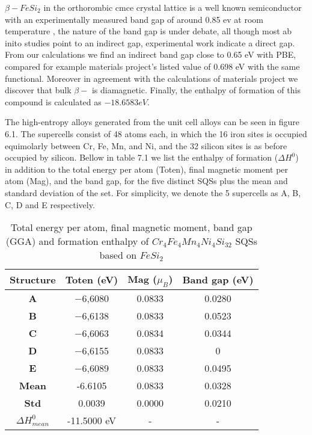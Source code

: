 $\beta-FeSi_2$ in the orthorombic cmce crystal lattice is a well known semiconductor with an experimentally measured band gap of around 0.85 ev at room temperature \cite{PhysRevB.58.10389}, the nature of the band gap is under debate, all though most ab inito studies point to an indirect gap, experimental work indicate a direct gap. From our calculations we find an indirect band gap close to 0.65 eV with PBE, compared for example materials project's listed value of 0.698 eV with the same functional. Moreover in agreement with the calculations of materials project we discover that bulk $\beta-$  is diamagnetic. Finally, the enthalpy of formation of this compound is calculated as $-18.6583 eV$.

The high-entropy alloys generated from the  unit cell alloys can be seen in figure 6.1. The supercells consist of 48 atoms each, in which the 16 iron sites is occupied equimolarly between Cr, Fe, Mn, and Ni, and the 32 silicon sites is as before occupied by silicon. Bellow in table 7.1 we list the enthalpy of formation ($\Delta H^0$) in addition to the total energy per atom (Toten), final magnetic moment per atom (Mag), and the band gap, for the five distinct SQSs plus the mean and standard deviation of the set. For simplicity, we denote the 5 supercells as A, B, C, D and E respectively.

\begin{table}[H]
\centering
\begin{tabular}{@{}cccc@{}}
\toprule
Structure  & Toten (eV) & Mag ($\mu_B$) & Band gap (eV) \\ \midrule
\textbf{A} & −6,6080                & 0.0833                    & 0.0280        \\
\textbf{B} & −6,6138                & 0.0833                    & 0.0523        \\
\textbf{C} & −6,6063                & 0.0834                    & 0.0344        \\
\textbf{D} & −6,6155                & 0.0833                    & 0             \\
\textbf{E} & −6,6089                & 0.0833                    & 0.0495        \\ \midrule
\textbf{Mean} & -6.6105 & 0.0833 & 0.0328    \\
\textbf{Std} & 0.0039 &  0.0000 &  0.0210 \\
\textbf{$\Delta H_{mean}^0$} & -11.5000 eV & - & - \\ \bottomrule
\end{tabular}
\caption{Total energy per atom, final magnetic moment, band gap (GGA) and formation enthalpy of $Cr_4Fe_4Mn_4Ni_4Si_{32}$ SQSs based on $FeSi_2$}
\label{table:fesi2_summary}
\end{table}  

